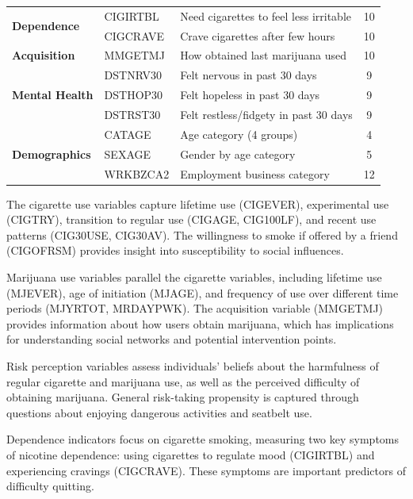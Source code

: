 \documentclass[conference]{IEEEtran}
\begin{document}
\begin{table}[t]
\begin{tabular}{@{}llp{7.5cm}c@{}}
\multirow{2}{*}{\textbf{Dependence}}
& CIGIRTBL & Need cigarettes to feel less irritable & 10 \\
& CIGCRAVE & Crave cigarettes after few hours & 10 \\ \midrule

\textbf{Acquisition} & MMGETMJ & How obtained last marijuana used & 10 \\ \midrule

\multirow{3}{*}{\textbf{Mental Health}}
& DSTNRV30 & Felt nervous in past 30 days & 9 \\
& DSTHOP30 & Felt hopeless in past 30 days & 9 \\
& DSTRST30 & Felt restless/fidgety in past 30 days & 9 \\ \midrule

\multirow{3}{*}{\textbf{Demographics}}
& CATAGE & Age category (4 groups) & 4 \\
& SEXAGE & Gender by age category & 5 \\
& WRKBZCA2 & Employment business category & 12 \\ \bottomrule
\end{tabular}
\end{table}

The cigarette use variables capture lifetime use (CIGEVER), experimental use (CIGTRY), transition to regular use (CIGAGE, CIG100LF), and recent use patterns (CIG30USE, CIG30AV). The willingness to smoke if offered by a friend (CIGOFRSM) provides insight into susceptibility to social influences.

Marijuana use variables parallel the cigarette variables, including lifetime use (MJEVER), age of initiation (MJAGE), and frequency of use over different time periods (MJYRTOT, MRDAYPWK). The acquisition variable (MMGETMJ) provides information about how users obtain marijuana, which has implications for understanding social networks and potential intervention points.

Risk perception variables assess individuals' beliefs about the harmfulness of regular cigarette and marijuana use, as well as the perceived difficulty of obtaining marijuana. General risk-taking propensity is captured through questions about enjoying dangerous activities and seatbelt use.

Dependence indicators focus on cigarette smoking, measuring two key symptoms of nicotine dependence: using cigarettes to regulate mood (CIGIRTBL) and experiencing cravings (CIGCRAVE). These symptoms are important predictors of difficulty quitting.
\end{document}
